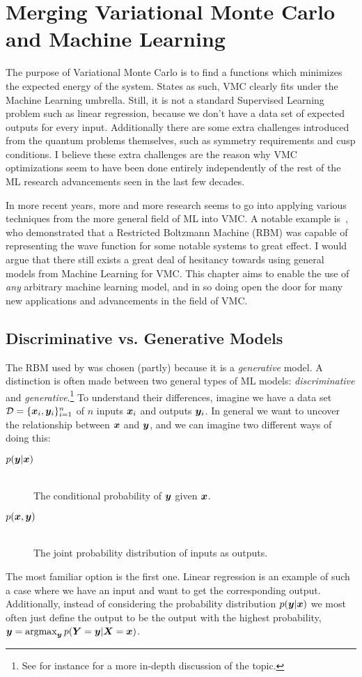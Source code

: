 \documentclass[Thesis.tex]{subfiles}
\begin{document}
\chapter{Merging Variational Monte Carlo and Machine Learning}
\label{chp:mergin-vmc-with-ml}

The purpose of Variational Monte Carlo is to find a functions which minimizes
the expected energy of the system. States as such, VMC clearly fits under the
Machine Learning umbrella. Still, it is not a standard Supervised Learning
problem such as linear regression, because we don't have a data set of expected
outputs for every input. Additionally there are some extra challenges introduced
from the quantum problems themselves, such as symmetry requirements and cusp
conditions. I believe these extra challenges are the reason why VMC
optimizations seem to have been done entirely independently of the rest of the
ML research advancements seen in the last few decades.

In more recent years, more and more research seems to go into applying various
techniques from the more general field of ML into VMC. A notable example
is~\textcite{Carleo602}, who demonstrated that a Restricted Boltzmann Machine
(RBM) was capable of representing the wave function for some notable systems to
great effect. I would argue that there still exists a great deal of hesitancy
towards using general models from Machine Learning for VMC. This chapter aims to
enable the use of \emph{any} arbitrary machine learning
model, and in so doing open the door for many new applications and advancements
in the field of VMC.


\section{Discriminative vs. Generative Models}


The RBM used by \textcite{Carleo602} was chosen (partly) because it is a
\emph{generative} model. A distinction is often made between two general types
of ML models:
\emph{discriminative} and \emph{generative}.\footnote{See for instance \textcite{Ng-2001} for
a more in-depth discussion of the topic.} To understand their differences,
imagine we have a data set $\mathcal{D} = \{\bm{x}_i, \bm{y}_i\}_{i=1}^n$ of $n$
inputs $\bm{x}_i$ and outputs $\bm{y}_i$. In general we want to uncover the
relationship between $\bm{x}$ and $\bm{y}$, and we can imagine two different ways of
doing this:

\begin{description}
\item[$p(\bm{y} | \bm{x})$]\hfill\\
  The conditional probability of $\bm{y}$ given $\bm{x}$.
\item[$p(\bm{x}, \bm{y})$] \hfill\\
  The joint probability distribution of inputs as outputs.
\end{description}
The most familiar option is the first one. Linear regression is an example of
such a case where we have an input and want to get the corresponding output.
Additionally, instead of considering the probability distribution $p(\bm{y}|\bm{x})$ we
most often just define the output to be the output with the highest probability,
$\bm{y} = \operatorname*{argmax}_{\bm{y}}p(\bm{Y} = \bm{y} | \bm{X} = \bm{x})$.
\end{document}
